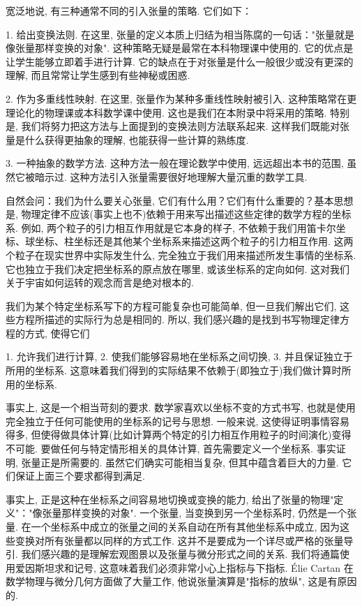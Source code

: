 宽泛地说, 有三种通常不同的引入张量的策略. 它们如下：

1. 给出变换法则. 在这里, 张量的定义本质上归结为相当陈腐的一句话："张量就是像张量那样变换的对象". 这种策略无疑是最常在本科物理课中使用的. 它的优点是让学生能够立即着手进行计算. 它的缺点在于对张量是什么一般很少或没有更深的理解, 而且常常让学生感到有些神秘或困惑.

2. 作为多重线性映射. 在这里, 张量作为某种多重线性映射被引入. 这种策略常在更理论化的物理课或本科数学课中使用. 这也是我们在本附录中将采用的策略. 特别是, 我们将努力把这方法与上面提到的变换法则方法联系起来. 这样我们既能对张量是什么获得更抽象的理解, 也能获得一些计算的熟练度.

3. 一种抽象的数学方法. 这种方法一般在理论数学中使用, 远远超出本书的范围, 虽然它被暗示过. 这种方法引入张量需要很好地理解大量沉重的数学工具.

自然会问：我们为什么要关心张量, 它们有什么用？它们有什么重要的？基本思想是, 物理定律不应该(事实上也不)依赖于用来写出描述这些定律的数学方程的坐标系. 例如, 两个粒子的引力相互作用就是它本身的样子, 不依赖于我们用笛卡尔坐标、球坐标、柱坐标还是其他某个坐标系来描述这两个粒子的引力相互作用. 这两个粒子在现实世界中实际发生什么, 完全独立于我们用来描述所发生事情的坐标系. 它也独立于我们决定把坐标系的原点放在哪里, 或该坐标系的定向如何. 这对我们关于宇宙如何运转的观念而言是绝对根本的.

我们为某个特定坐标系写下的方程可能复杂也可能简单, 但一旦我们解出它们, 这些方程所描述的实际行为总是相同的. 所以, 我们感兴趣的是找到书写物理定律方程的方式, 使得它们

1. 允许我们进行计算, 
2. 使我们能够容易地在坐标系之间切换, 
3. 并且保证独立于所用的坐标系. 这意味着我们得到的实际结果不依赖于(即独立于)我们做计算时所用的坐标系.

事实上, 这是一个相当苛刻的要求. 数学家喜欢以坐标不变的方式书写, 也就是使用完全独立于任何可能使用的坐标系的记号与思想. 一般来说, 这使得证明事情容易得多, 但使得做具体计算(比如计算两个特定的引力相互作用粒子的时间演化)变得不可能. 要做任何与特定情形相关的具体计算, 首先需要定义一个坐标系. 事实证明, 张量正是所需要的. 虽然它们确实可能相当复杂, 但其中蕴含着巨大的力量. 它们保证上面三个要求都得到满足.

事实上, 正是这种在坐标系之间容易地切换或变换的能力, 给出了张量的物理"定义"："像张量那样变换的对象". 一个张量, 当变换到另一个坐标系时, 仍然是一个张量. 在一个坐标系中成立的张量之间的关系自动在所有其他坐标系中成立, 因为这些变换对所有张量都以同样的方式工作. 这并不是要成为一个详尽或严格的张量导引. 我们感兴趣的是理解宏观图景以及张量与微分形式之间的关系. 我们将通篇使用爱因斯坦求和记号, 这意味着我们必须非常小心上指标与下指标. Élie Cartan 在数学物理与微分几何方面做了大量工作, 他说张量演算是"指标的放纵", 这是有原因的.

